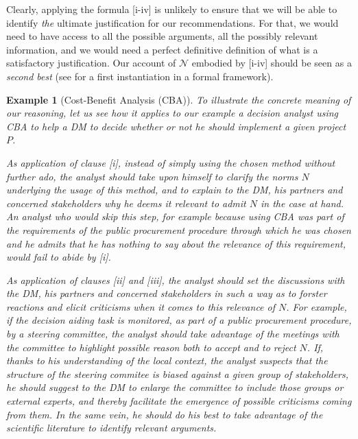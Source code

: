 \documentclass[preprint, french, english, 11pt, authoryear]{elsarticle}%
\newtheorem{example}{Example}
\newcommand{\adv}{\mathscr{N}}
\begin{document}
Clearly, applying the formula [i-iv] is unlikely to ensure that we will be able to identify \emph{the} ultimate justification for our recommendations. For that, we would need to have access to all the possible arguments, all the possibly relevant information, and we would need a perfect definitive definition of what is a satisfactory justification. Our account of $\adv$ embodied by [i-iv] should be seen as a \emph{second best} (see \cite{cailloux_formal_2018} for a first instantiation in a formal framework).

\begin{example}[Cost-Benefit Analysis (CBA)]
To illustrate the concrete meaning of our reasoning, let us see how it applies to our example a decision analyst using CBA to help a \ac{DM} to decide whether or not he should implement a given project $P$.

As application of clause [i], instead of simply using the chosen method without further ado, the analyst should take upon himself to clarify the norms $N$ underlying the usage of this method, and to explain to the \ac{DM}, his partners and concerned stakeholders why he deems it relevant to admit $N$ in the case at hand. An analyst who would skip this step, for example because using CBA was part of the requirements of the public procurement procedure through which he was chosen and he admits that he has nothing to say about the relevance of this requirement, would fail to abide by [i].

As application of clauses [ii] and [iii], the analyst should set the discussions with the \ac{DM}, his partners and concerned stakeholders in such a way as to forster reactions and elicit criticisms when it comes to this relevance of $N$. For example, if the decision aiding task is monitored, as part of a public procurement procedure, by a steering committee, the analyst should take advantage of the meetings with the committee to highlight possible reason both to accept and to reject $N$. If, thanks to his understanding of the local context, the analyst suspects that the structure of the steering commitee is biased against a given group of stakeholders, he should suggest to the \ac{DM} to enlarge the committee to include those groups or external experts, and thereby facilitate the emergence of possible criticisms coming from them. In the same vein, he should do his best to take advantage of the scientific literature to identify relevant arguments.  


\end{example}
\end{document}
